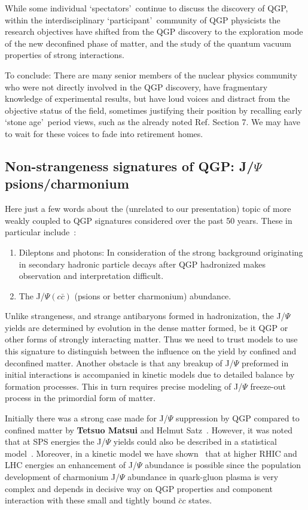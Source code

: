 While some individual \lq spectators\rq\ continue to discuss the discovery of QGP, within the interdisciplinary \lq participant\rq\ community of QGP physicists the research objectives have shifted from the QGP discovery to the exploration mode of the new deconfined phase of matter, and the study of the quantum vacuum properties of strong interactions. 

To conclude: There are many senior members of the nuclear physics community who were not directly involved in the QGP discovery, have fragmentary knowledge of experimental results, but have loud voices and distract from the objective status of the field, sometimes justifying their position by recalling early \lq stone age\rq\ period views, such as the already noted Ref.\cite{Muller:1991jk} Section 7. We may have to wait for these voices to fade into retirement homes. 


\subsection{Non-strangeness signatures of QGP: J/$\Psi$ psions/charmonium}
Here just a few words about the (unrelated to our presentation) topic of more weakly coupled to QGP signatures considered over the past 50 years. These in particular include~\cite{Shuryak:1978ij}:
\begin{enumerate}
\item Dileptons and photons: In consideration of the strong background originating in secondary hadronic particle decays after QGP hadronized makes observation and interpretation difficult. 
\item The J/$\Psi(c\bar c)$ (psions or better charmonium) abundance. 
\end{enumerate}
Unlike strangeness, and strange antibaryons formed in hadro\-nization, the J/$\Psi$ yields are determined by evolution in the dense matter formed, be it QGP or other forms of strongly interacting matter. Thus we need to trust models to use this signature to distinguish between the influence on the yield by confined and deconfined matter. Another obstacle is that any breakup of J/$\Psi$ preformed in initial interactions is accompanied in kinetic models due to detailed balance by formation processes. This in turn requires precise modeling of J/$\Psi$ freeze-out process in the primordial form of matter.

Initially there was a strong case made for J/$\Psi$ suppression by QGP compared to confined matter by \textbf{Tetsuo Matsui} and Helmut Satz~\cite{Matsui:1986dk}. However, it was noted that at SPS energies the J/$\Psi$ yields could also be described in a statistical model~\cite{Gazdzicki:1999rk,BraunMunzinger:2000px}. Moreover, in a kinetic model we have shown~\cite{Thews:2000rj} that at higher RHIC and LHC energies an enhancement of J/$\Psi$ abundance is possible since the population development of charmonium J/$\Psi$ abundance in quark-gluon plasma is very complex and depends in decisive way on QGP properties and component interaction with these small and tightly bound $\bar c c $ states.

